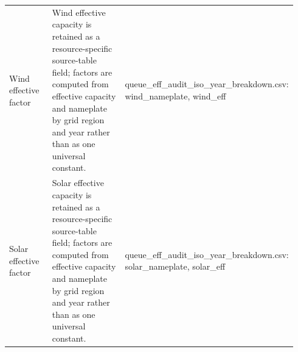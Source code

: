 \begin{table}[H]
{\begin{tabular}{L{0.18\linewidth}L{0.43\linewidth}L{0.33\linewidth}}
Wind effective factor & Wind effective capacity is retained as a resource-specific source-table field; factors are computed from effective capacity and nameplate by grid region and year rather than as one universal constant. & queue\_eff\_audit\_iso\_year\_breakdown.csv: wind\_nameplate, wind\_eff \\
Solar effective factor & Solar effective capacity is retained as a resource-specific source-table field; factors are computed from effective capacity and nameplate by grid region and year rather than as one universal constant. & queue\_eff\_audit\_iso\_year\_breakdown.csv: solar\_nameplate, solar\_eff \\
\bottomrule
\end{tabular}%
}
\end{table}
\endgroup

